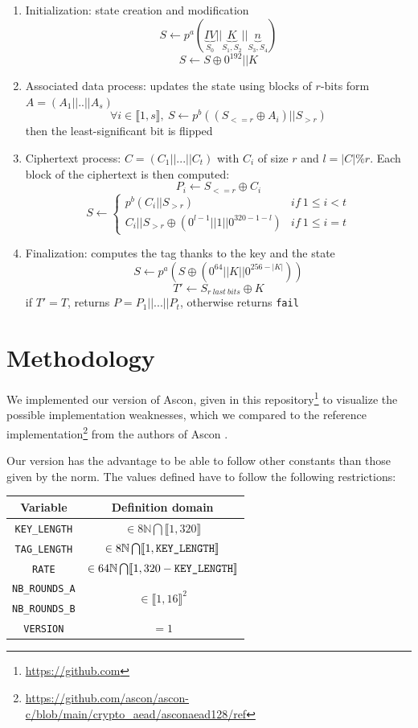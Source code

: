 \documentclass[a4paper,11pt,twocolumn]{article}
\begin{document}
		\begin{enumerate}
		\item Initialization: state creation and modification
		$$S \leftarrow p^{a}( \underbrace{IV}_{S_0}||\underbrace{K}_{S_1,S_2}||\underbrace{n}_{S_3,S_4})$$
		$$S \leftarrow S \oplus 0^{192} || K$$
		\item Associated data process: updates the state using blocks of $r$-bits form $A=(A_1||..||A_s)$
		$$\forall i \in \llbracket 1,s \rrbracket,\  S \leftarrow p^b((S_{<=r} \oplus A_i)||S_{>r})$$
		then the least-significant bit is flipped
		\item Ciphertext process: $C = (C_1 || ... || C_t)$ with $C_i$ of size $r$ and $l=|C| \% r$. Each block of the ciphertext is then computed:
		$$P_i \leftarrow S_{<=r} \oplus C_i$$
		$$S \leftarrow \left \{	\begin{array}{ll}
			p^b(C_i||S_{>r}) & if\ 1 \le i < t \\
			C_i||S_{>r} \oplus  (0^{l-1}||1||0^{320-1-l}) & if\ 1 \le i = t
		\end{array}
		\right.$$
		\item Finalization: computes the tag thanks to the key and the state
		$$S \leftarrow p^a(S \oplus (0^{64} || K || 0^{256-|K|}))$$
		$$T' \leftarrow S_{r\ last\ bits} \oplus K$$
		if $T'= T$, returns $P = P_1 || ... || P_t$, otherwise returns \verb|fail|
		\end{enumerate}
		
		\section{Methodology}
		We implemented our version of Ascon, given in this repository\footnote{\url{https://github.com}} to visualize the possible implementation weaknesses, which we compared to the reference implementation\footnote{\url{https://github.com/ascon/ascon-c/blob/main/crypto\_aead/asconaead128/ref}} from the authors of Ascon \cite{ascon}.
				
		Our version has the advantage to be able to follow other constants than those given by the norm. The values defined have to follow the following restrictions:
		
		\begin{center}
			\footnotesize
			\begin{tabular}{|c|c|}
				\hline
				\textbf{Variable} & \textbf{Definition domain}\\
				\hline
				\verb|KEY_LENGTH| & $\in 8\mathbb{N} \bigcap \llbracket 1,320 \rrbracket$\\
				\hline
				\verb|TAG_LENGTH| & $\in 8\mathbb{N} \bigcap \llbracket 1,\verb|KEY_LENGTH| \rrbracket$\\
				\hline
				\verb|RATE| & $\in 64\mathbb{N} \bigcap \llbracket 1,320-\verb|KEY_LENGTH| \rrbracket$\\
				\hline
				\verb|NB_ROUNDS_A| & \multirow{2}{*}{$\in \llbracket 1,16 \rrbracket^2$}\\
				\verb|NB_ROUNDS_B| &\\
				\hline
				\verb|VERSION| & $=1$ \\
				\hline
			\end{tabular}
		\end{center}
		
\end{document}
